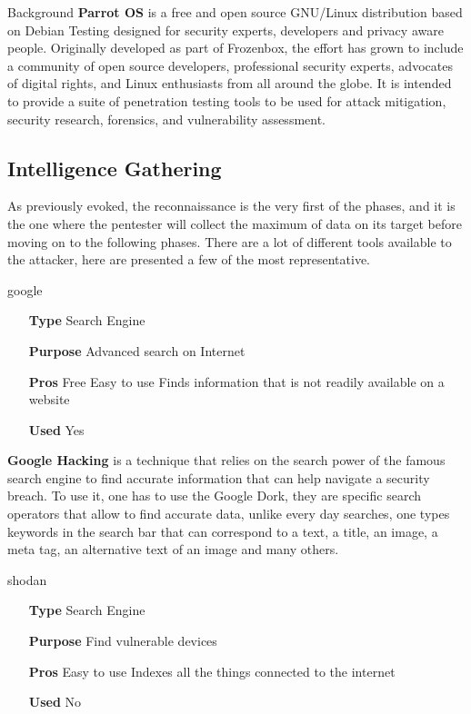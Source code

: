 \begin{chaptercover}{Background}
\textbf{Parrot OS} \cite{parrot-os} is a free and open source GNU/Linux distribution based on Debian Testing designed for security experts, developers and privacy aware people. Originally developed as part of Frozenbox, the effort has grown to include a community of open source developers, professional security experts, advocates of digital rights, and Linux enthusiasts from all around the globe. It is intended to provide a suite of penetration testing tools to be used for attack mitigation, security research, forensics, and vulnerability assessment.

\subsection{Intelligence Gathering}

As previously evoked, the reconnaissance is the very first of the phases, and it is the one where the pentester will collect the maximum of data on its target before moving on to the following phases. There are a lot of different tools available to the attacker, here are presented a few of the most representative.

\begin{solutiondata}{google}
\begin{itemize}[labelsep=1cm]
  \item [\textbf{Type}] Search Engine
  \item [\textbf{Purpose}] Advanced search on Internet
  \item [\textbf{Pros}] Free \newline Easy to use \newline Finds information that is not readily available on a website
  \item [\textbf{Used}] Yes
\end{itemize}
\end{solutiondata}

\textbf{Google Hacking} \cite{google-hacking} is a technique that relies on the search power of the famous search engine to find accurate information that can help navigate a security breach. To use it, one has to use the Google Dork, they are specific search operators that allow to find accurate data, unlike every day searches, one types keywords in the search bar that can correspond to a text, a title, an image, a meta tag, an alternative text of an image and many others.

\begin{solutiondata}{shodan}
\begin{itemize}[labelsep=1cm]
  \item [\textbf{Type}] Search Engine
  \item [\textbf{Purpose}] Find vulnerable devices
  \item [\textbf{Pros}] Easy to use \newline Indexes all the things connected to the internet
  \item [\textbf{Used}] No
\end{itemize}
\end{solutiondata}


\end{chaptercover}
